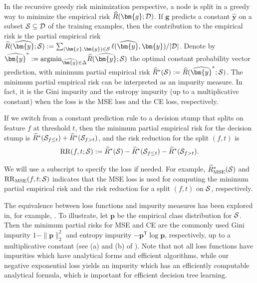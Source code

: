 \documentclass[letterpaper]{article} %
\newcommand{\bx}{{\bm{x}}}
\newcommand{\bp}{{\bm{p}}}
\newcommand{\bg}{{\bm{g}}}
\newcommand{\by}{{\bm{y}}}
\newcommand{\T}{{\mathsf{T}}}
\newcommand{\cS}{{\cal{S}}}
\newcommand{\cD}{{\cal{D}}}
\newcommand{\simplex}{\Delta}
\newcommand{\argmin}{\mathrm{argmin}}
\newcommand{\RR}{{\rm RR}}
\begin{document}
In the recursive greedy risk minimization perspective, a node is split in a greedy way to minimize
the empirical risk $\widehat{R}(\bg;\cD)$.
If $\bg$ predicts a constant $\widehat{\by}$ on a subset $\cS\subseteq \cD$ of the training examples, then the contribution to the empirical risk is the partial empirical risk
$\widehat{R}(\widehat{\by};\cS):=\sum_{(\bx,\by)\in\cS}  \ell(\widehat{\by},\by)/|\cD|$.
Denote by
$\widehat{\by}^*:=\argmin_{\widehat{\by}\in\simplex}\widehat{R}(\widehat{\by};\cS)$ the optimal constant probability vector prediction, with minimum partial empirical risk $\widehat{R}^*(\cS):=\widehat{R}(\widehat{\by}^*;\cS)$.
The minimum partial empirical risk can be interpreted as an impurity measure.
In fact, it is the Gini impurity and the entropy impurity (up
to a multiplicative constant) when the loss is the MSE loss and the CE loss,
respectively.

If we switch from a constant prediction rule to a decision stump that splits on feature $f$ at threshold $t$, then the minimum partial empirical risk for the decision stump is $\widehat{R}^*(\cS_{f\leq t})+\widehat{R}^*(\cS_{f> t})$, and the risk reduction for the split $(f,t)$ is
\begin{equation}
    \RR(f,t;\cS) := \widehat{R}^*(\cS) - \widehat{R}^*(\cS_{f\leq t}) - \widehat{R}^*(\cS_{f> t}).
\end{equation}

We will use a subscript to specify the loss if needed.
For example, $\widehat{R}_{\mathrm{MSE}}^*(\cS)$ and
$\RR_{\mathrm{MSE}}(f,t;\cS)$ indicates that the MSE loss is used for computing
the minimum partial empirical risk and the risk reduction for a split $(f, t)$
on $\cS$, respectively.

The equivalence between loss functions and impurity measures has been explored
in, for example,
\cite{yang2019robust, wilton2022positive}.
To illustrate, let $\bp$ be the empirical class distribution for $\cS$.
Then the minimum partial risks for MSE and CE are the commonly used Gini
impurity $1-\|\bp\|_2^2$ and entropy impurity $-\bp^\T\log \bp$, respectively, up
to a multiplicative constant (see (a) and (b) of ).
Note that not all loss functions have impurities which have analytical forms and
efficient algorithms, while our negative exponential loss yields an
impurity which has an efficiently computable analytical formula, which is
important for efficient decision tree learning.
\end{document}
